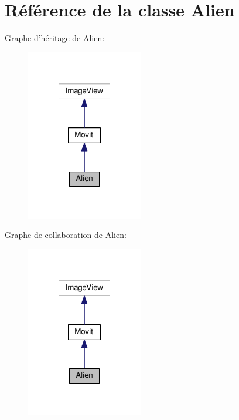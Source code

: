 \hypertarget{class_alien}{\section{Référence de la classe Alien}
\label{class_alien}
}


Graphe d'héritage de Alien\-:
\nopagebreak
\begin{figure}[H]
\begin{center}
\leavevmode
\includegraphics[width=144pt]{class_alien__inherit__graph}
\end{center}
\end{figure}


Graphe de collaboration de Alien\-:
\nopagebreak
\begin{figure}[H]
\begin{center}
\leavevmode
\includegraphics[width=144pt]{class_alien__coll__graph}
\end{center}
\end{figure}
